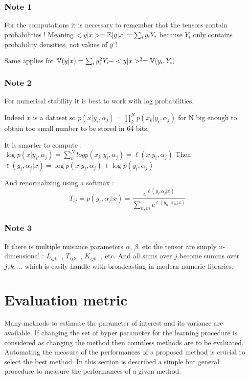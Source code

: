 \subsubsection{Note 1}

For the computations it is necessary to remember that the tensors contain probabilities !
Meaning $<y|x>= \mathbb{E}[y|x] = \sum_i y_i Y_i$ because $Y_i$ only contains probability densities, not values of $y$ !

Same applies for $\mathbb{V}(y|x) = \sum_i y_i^2 Y_i - <y|x>^2 = \mathbb{V}(y_i, Y_i)$


\subsubsection{Note 2}

For numerical stability it is best to work with log probabilities.

Indeed $x$ is a dataset so $p(x | y_i, \alpha_j) = \prod_k^N p(x_k | y_i, \alpha_j)$ for N big enough to obtain too small number to be stored in 64 bits.

It is smarter to compute : $\log p(x | y_i, \alpha_j) = \sum_k^N log p(x_k | y_i, \alpha_j) = \ell(x | y_i, \alpha_j)$
Then $\ell(y_i, \alpha_j| x) = \log p(x|y_i, \alpha_j) + \log p(y_i, \alpha_j)$

And renormalizing using a softmax :
$$ 
    T_{ij} = p(y_i, \alpha_j | x) = \frac{e^{\ell(y_i, \alpha_j| x)} }{\sum_{n,m} e^{\ell(y_n, \alpha_m| x)} }
$$


\subsubsection{Note 3}

If there is multiple nuisance parameters $\alpha$, $\beta$, etc the tensor are simply n-dimensional : $L_{ijk...}$, $T_{ijk...}$, $K_{ijk...}$, etc.
And all sums over $j$ become summs over $j,k, ...$ which is easily handle with broadcasting in modern numeric libraries.



\section{Evaluation metric} %
\label{sec:evaluation_metric}


Many methods to estimate the parameter of interest and its variance are available.
If changing the set of hyper parameter for the learning procedure is considered as changing the method then countless methods are to be evaluated.
Automating the measure of the performances of a proposed method is crucial to select the best method.
In this section is described a simple but general procedure to measure the performances of a given method.


